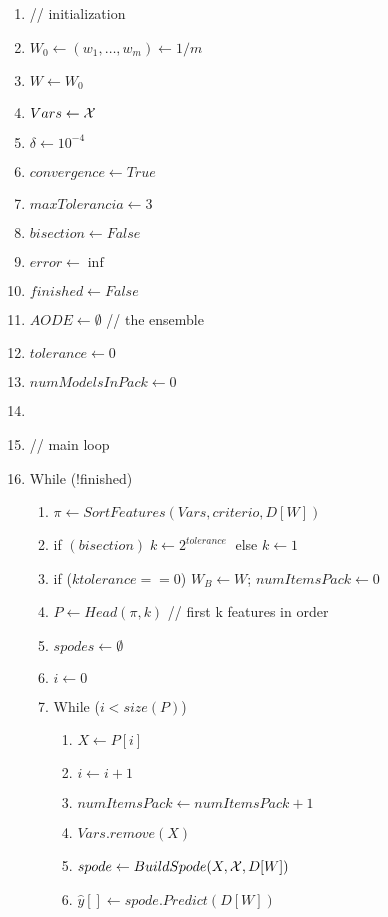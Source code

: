 \begin{enumerate}
\item[] // initialization
\item $W_0 \leftarrow (w_1, \dots, w_m) \leftarrow 1/m$
\item $W \leftarrow W_0$
\item $Vars \leftarrow {\cal{X}}$
\item $\delta \leftarrow 10^{-4}$
\item $convergence \leftarrow True$
\item $maxTolerancia \leftarrow 3$
\item $bisection \leftarrow False$
\item $error \leftarrow \inf$ 
\item $finished \leftarrow False$
\item $AODE \leftarrow \emptyset$ \hspace*{2cm} // the ensemble
\item $tolerance \leftarrow 0$
\item $numModelsInPack \leftarrow 0$
\item[] 
\newpage
\item[] // main loop
\item While (!finished)
\begin{enumerate}
    \item $\pi \leftarrow SortFeatures(Vars, criterio, D[W])$
    \item if $(bisection) \; k \leftarrow 2^{tolerance} \;$ else $k \leftarrow 1$
    \item if ($k tolerance == 0$) $W_B \leftarrow W$; $numItemsPack \leftarrow0$
    \item $P \leftarrow Head(\pi,k)$ \hspace*{2cm} //  first k features in order
    \item $spodes \leftarrow \emptyset$
    \item $i \leftarrow 0$
    \item While ($ i < size(P)$)
    \begin{enumerate}
        \item $X \leftarrow P[i]$
        \item $i \leftarrow i + 1$
        \item $numItemsPack \leftarrow numItemsPack + 1$
        \item $Vars.remove(X)$
        \item $spode \leftarrow BuildSpode(X, {\cal{X}}, D[W])$
        \item $\hat{y}[] \leftarrow spode.Predict(D[W])$

\end{enumerate}
\end{enumerate}
\end{enumerate}
